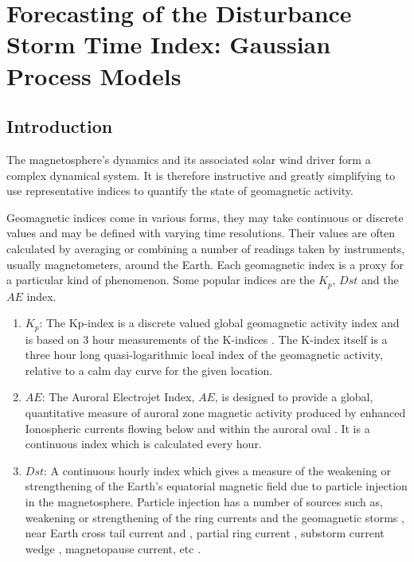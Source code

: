 \chapter{Forecasting of the Disturbance Storm Time Index: Gaussian Process Models}\label{chapter:first_real_chapter}

\section{Introduction}


The magnetosphere's dynamics and its associated solar wind driver form a complex dynamical system. It is therefore instructive and greatly simplifying to use representative indices to quantify the state of geomagnetic activity.

Geomagnetic indices come in various forms, they may take continuous or discrete values and may be defined with varying time resolutions. Their values are often calculated by averaging or combining a number of readings taken by instruments, usually magnetometers, around the Earth. Each geomagnetic index is a proxy for a particular kind of phenomenon. Some popular indices are the $K_p$, $Dst$ and the $AE$ index.


\begin{enumerate}
    \item $K_p$: The Kp-index is a discrete valued global geomagnetic activity index and is based on 3 hour measurements of the K-indices \cite{Bartels}. The K-index itself is a three hour long quasi-logarithmic local index of the geomagnetic activity, relative to a calm day curve for the given location.
    
    \item $AE$: The Auroral Electrojet Index, $AE$, is designed to provide a global, quantitative measure of auroral zone magnetic activity produced by enhanced Ionospheric currents flowing below and within the auroral oval \cite{AEIndex}. It is a continuous index which is calculated every hour.
    
    \item $Dst$: A continuous hourly index which gives a measure of the weakening or strengthening of the Earth's equatorial magnetic field due to particle injection in the magnetosphere. Particle injection has a number of sources such as, weakening or strengthening of the ring currents and the geomagnetic storms \cite{DesslerAndParker}, near Earth cross tail current \cite{ganushkina2004long} and \cite{angeo-28-123-2010}, partial ring current \cite{JGRA:JGRA15878}, substorm current wedge \cite{JGRA:JGRA15211}, magnetopause current, etc . 
\end{enumerate}

